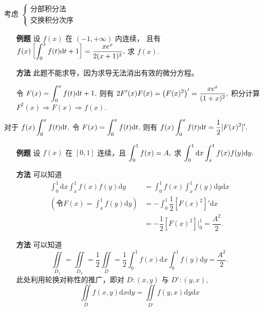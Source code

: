考虑 $ \begin{cases}
    \textrm{分部积分法}\\\textrm{交换积分次序}
\end{cases} $ 


\begin{enumerate}
    \item[\textbf{例题}] 设 $ f(x) $ 在 $ (-1,+\infty) $ 内连续，
    且有 $ \displaystyle f(x)\left[\int_0^xf(t)\mathrm{d}t+1\right]=\dfrac{xe^x}{2(x+1)^2}, $
    求 $ f(x). $ 
    \item[\textbf{方法}] 此题不能求导，因为求导无法消出有效的微分方程。
    
    令 $ \displaystyle F(x) = \int_0^xf(t)\mathrm{d}t + 1, $ 
    则有 $ \displaystyle 2F'(x)F(x) = \left(F(x)^2\right)' = \dfrac{xe^x}{(1+x)^2}, $ 
    积分计算 $ F^2(x)\Rightarrow F(x)\Rightarrow f(x). $ 
\end{enumerate}

对于 $ \displaystyle f(x)\int_0^x f(t)\mathrm{d}t, $ 令 $\displaystyle F(x) = \int_0^xf(t)\mathrm{d}t, $ 
则有 $ \displaystyle f(x)\int_0^x f(t)\mathrm{d}t = \dfrac{1}{2}[F(x)^2]'. $ 

\begin{enumerate}
    \item[\textbf{例题}] 设 $ f(x) $ 在 $ [0,1] $ 连续，且 $ \displaystyle \int_0^1 f(x)=A, $ 
    求 $ \displaystyle \int_0^1 \mathrm{d}x\int_x^1 f(x)f(y)\mathrm{d}y. $ 
    \item[\textbf{方法}] 可以知道
    \begin{equation*}
        \begin{aligned}
            \int_0^1 \mathrm{d}x\int_x^1 f(x)f(y)\mathrm{d}y &= 
            \int_0^1 f(x)\int_x^1f(y)\mathrm{d}y\mathrm{d}x \\ 
            (\textrm{令}F(x) = \int_x^1f(y)\mathrm{d}y)&= 
            -\int_0^1 \dfrac{1}{2}\left[F(x)^2\right]'\mathrm{d}x \\ 
            &= -\dfrac{1}{2}\left[F(x)^2\right]\Big|_0^1 = \dfrac{A^2}{2}.
        \end{aligned}
    \end{equation*}
    \item[\textbf{方法}] 可以知道
    $$
        \iint\limits_{D_1} = \iint\limits_{D_2} = \dfrac{1}{2}\iint\limits_{D}
        = \dfrac{1}{2}\int_0^1f(x)\mathrm{d}x\int_0^1f(y)\mathrm{d}y = \dfrac{A^2}{2}.
    $$
    此处利用轮换对称性的推广，即对 $ D:(x,y) $ 与 $ D':(y,x), $ 
    $$
        \iint\limits_{D}f(x,y)\mathrm{d}x\mathrm{d}y = 
        \iint\limits_{D'}f(y,x)\mathrm{d}y\mathrm{d}x
    $$
\end{enumerate}

